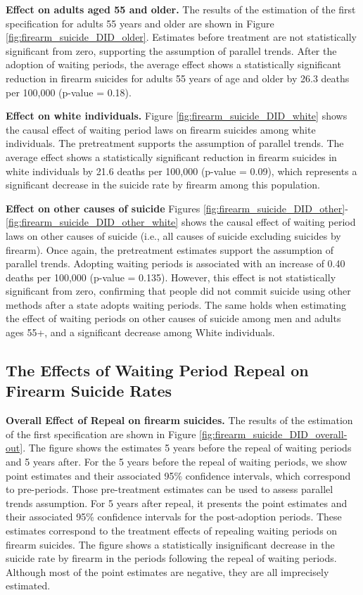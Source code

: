 \textbf{Effect on adults aged 55 and older. } The results of the estimation of the first specification for adults 55 years and older are shown in Figure \ref{fig:firearm_suicide_DID_older}. Estimates before treatment are not statistically significant from zero, supporting the assumption of parallel trends. After the adoption of waiting periods, the average effect shows a statistically significant reduction in firearm suicides for adults 55 years of age and older by 26.3 deaths per 100,000 (p-value = 0.18). 

\textbf{Effect on white individuals.} Figure \ref{fig:firearm_suicide_DID_white} shows the causal effect of waiting period laws on firearm suicides among white individuals. The pretreatment supports the assumption of parallel trends. The average effect shows a statistically significant reduction in firearm suicides in white individuals by 21.6 deaths per 100,000 (p-value = 0.09), which represents a significant decrease in the suicide rate by firearm among this population.

\textbf{Effect on other causes of suicide} Figures \ref{fig:firearm_suicide_DID_other}-\ref{fig:firearm_suicide_DID_other_white} shows the causal effect of waiting period laws on other causes of suicide (i.e., all causes of suicide excluding suicides by firearm). Once again, the pretreatment estimates support the assumption of parallel trends. Adopting waiting periods is associated with an increase of 0.40 deaths per 100,000 (p-value = 0.135). However, this effect is not statistically significant from zero, confirming that people did not commit suicide using other methods after a state adopts waiting periods. The same holds when estimating the effect of waiting periods on other causes of suicide among men and adults ages 55+, and a significant decrease among White individuals.

\subsection*{The Effects of Waiting Period Repeal on Firearm Suicide Rates}
\textbf{Overall Effect of Repeal on firearm suicides.} The results of the estimation of the first specification are shown in Figure \ref{fig:firearm_suicide_DID_overall-out}. The figure shows the estimates 5 years before the repeal of waiting periods and 5 years after. For the 5 years before the repeal of waiting periods, we show point estimates and their associated 95\% confidence intervals, which correspond to pre-periods. Those pre-treatment estimates can be used to assess parallel trends assumption. For 5 years after repeal, it presents the point estimates and their associated 95\% confidence intervals for the post-adoption periods. These estimates correspond to the treatment effects of repealing waiting periods on firearm suicides. The figure shows a statistically insignificant decrease in the suicide rate by firearm in the periods following the repeal of waiting periods. Although most of the point estimates are negative, they are all imprecisely estimated.

